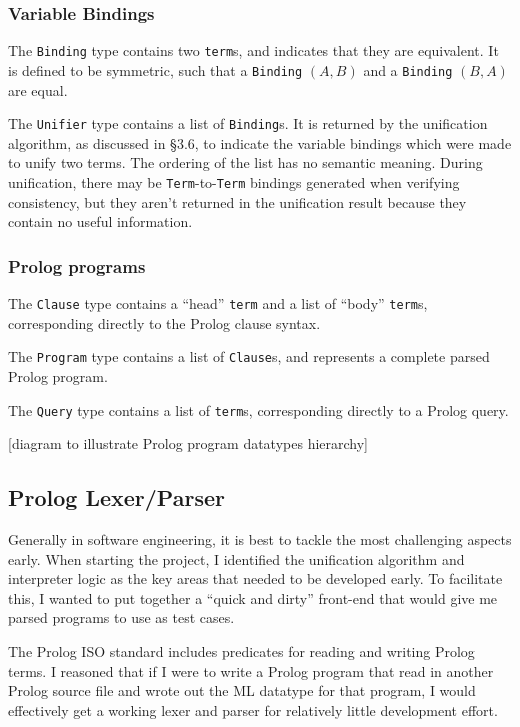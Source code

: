 \documentclass[12pt]{article}
\begin{document}
\subsubsection{Variable Bindings}

The \verb|Binding| type contains two \verb|term|s, and indicates that they are equivalent. 
It is defined to be symmetric, such that a \verb|Binding| $(A,B)$ and a \verb|Binding| $(B,A)$ are equal.

The \verb|Unifier| type contains a list of \verb|Binding|s. 
It is returned by the unification algorithm, as discussed in \S3.6, to indicate the variable bindings which were made to unify two terms. 
The ordering of the list has no semantic meaning.
During unification, there may be \verb|Term|-to-\verb|Term| bindings generated when verifying consistency, but they aren't returned in the unification result because they contain no useful information.

\subsubsection{Prolog programs}

The \verb|Clause| type contains a ``head'' \verb|term| and a list of ``body'' \verb|term|s, corresponding directly to the Prolog clause syntax.

The \verb|Program| type contains a list of \verb|Clause|s, and represents a complete parsed Prolog program.

The \verb|Query| type contains a list of \verb|term|s, corresponding directly to a Prolog query.

[diagram to illustrate Prolog program datatypes hierarchy]

\subsection{Prolog Lexer/Parser}

Generally in software engineering, it is best to tackle the most challenging aspects early. 
When starting the project, I identified the unification algorithm and interpreter logic as the key areas that needed to be developed early. 
To facilitate this, I wanted to put together a ``quick and dirty'' front-end that would give me parsed programs to use as test cases.

The Prolog ISO standard includes predicates for reading and writing Prolog terms. 
I reasoned that if I were to write a Prolog program that read in another Prolog source file and wrote out the ML datatype for that program, I would effectively get a working lexer and parser for relatively little development effort. 
\end{document}
